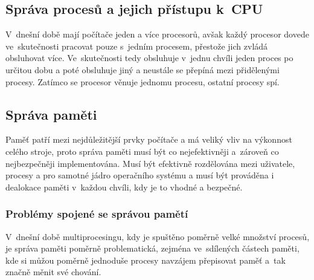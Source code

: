 \documentclass[11pt,a4paper,titlepage]{article}
\begin{document}
\subsection{Správa procesů a jejich přístupu k~CPU}
V~dnešní době mají počítače jeden a více procesorů, avšak každý procesor dovede
ve~skutečnosti pracovat pouze s~jedním procesem, přestože jich zvládá obsluhovat
více. Ve~skutečnosti tedy obsluhuje v~jednu chvíli jeden proces po určitou dobu
a poté obsluhuje jiný a neustále se přepíná mezi přidělenými procesy. Zatímco
se procesor věnuje jednomu procesu, ostatní procesy spí.\cite{article:memory-management}

\subsection{Správa paměti}
Paměť patří mezi nejdůležitější prvky počítače a má veliký vliv na výkonnost
celého stroje, proto správa paměti musí být co nejefektivněji a~zároveň co nejbezpečněji
implementována. Musí být efektivně rozdělována mezi uživatele, procesy
a pro samotné jádro operačního systému a musí být prováděna i dealokace paměti
v~každou chvíli, kdy je to vhodné a bezpečné.\cite{bc:linux-pamet}

\subsubsection{Problémy spojené se správou pamětí}
V~dnešní době multiprocesingu, kdy je spuštěno poměrně velké množství procesů,
je správa paměti poměrně problematická, zejména ve~sdílených částech paměti, kde
si můžou poměrně jednoduše procesy navzájem přepisovat paměť a~tak značně měnit
své chování.

\newpage

\end{document}
